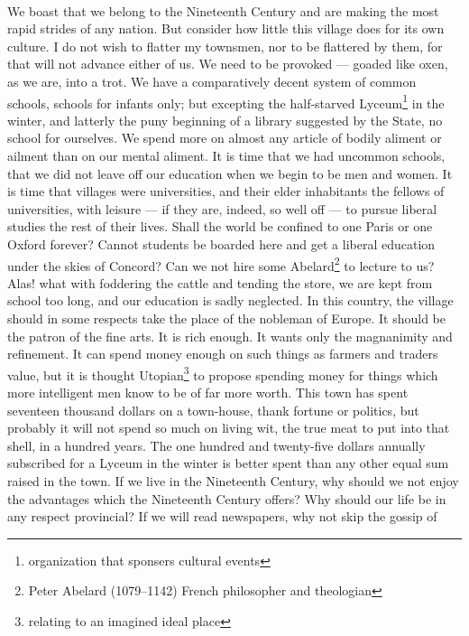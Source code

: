 \documentclass[letterpaper,12pt]{article}
\begin{document}
\paragraph{}
We boast that we belong to the Nineteenth Century and are making the most rapid
strides of any nation. But consider how little this village does for its own
culture. I do not wish to flatter my townsmen, nor to be flattered by them, for
that will not advance either of us. We need to be provoked --- goaded like oxen,
as we are, into a trot. We have a comparatively decent system of common schools,
schools for infants only; but excepting the half-starved
Lyceum\footnote{organization that sponsers cultural events} in the winter, and
latterly the puny beginning of a library suggested by the State, no school for
ourselves. We spend more on almost any article of bodily aliment or ailment than
on our mental aliment. It is time that we had uncommon schools, that we did not
leave off our education when we begin to be men and women. It is time that
villages were universities, and their elder inhabitants the fellows of
universities, with leisure --- if they are, indeed, so well off --- to pursue
liberal studies the rest of their lives. Shall the world be confined to one
Paris or one Oxford forever? Cannot students be boarded here and get a liberal
education under the skies of Concord? Can we not hire some
Abelard\footnote{Peter Abelard (1079--1142) French philosopher and theologian}
to lecture to us? Alas! what with foddering the cattle and tending the store, we
are kept from school too long, and our education is sadly neglected. In this
country, the village should in some respects take the place of the nobleman of
Europe. It should be the patron of the fine arts. It is rich enough. It wants
only the magnanimity and refinement. It can spend money enough on such things as
farmers and traders value, but it is thought Utopian\footnote{relating to an
    imagined ideal place} to propose spending money for things which more
intelligent men know to be of far more worth. This town has spent seventeen
thousand dollars on a town-house, thank fortune or politics, but probably it
will not spend so much on living wit, the true meat to put into that shell, in a
hundred years. The one hundred and twenty-five dollars annually subscribed for a
Lyceum in the winter is better spent than any other equal sum raised in the
town. If we live in the Nineteenth Century, why should we not enjoy the
advantages which the Nineteenth Century offers? Why should our life be in any
respect provincial? If we will read newspapers, why not skip the gossip of
\end{document}
